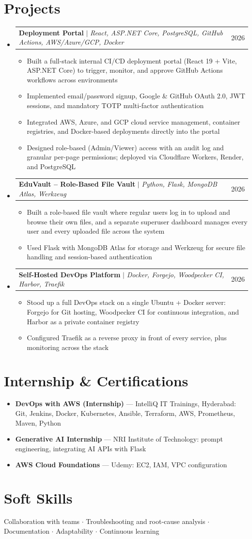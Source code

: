 \documentclass[letterpaper,11pt]{article}
\makeatletter
\newcommand{\resumeItem}[1]{
  \item\small{
    {#1 \vspace{-2pt}}
  }
}
\newcommand{\resumeProjectHeading}[2]{
    \item
    \begin{tabular*}{0.97\textwidth}{l@{\extracolsep{\fill}}r}
      \small#1 & #2 \\
    \end{tabular*}\vspace{-7pt}
}
\newcommand{\resumeSubHeadingListStart}{\begin{itemize}[leftmargin=0.15in, label={}]}
\newcommand{\resumeSubHeadingListEnd}{\end{itemize}}
\newcommand{\resumeItemListStart}{\begin{itemize}}
\newcommand{\resumeItemListEnd}{\end{itemize}\vspace{-5pt}}
\makeatother
\begin{document}
\section{Projects}
    \resumeSubHeadingListStart

      \resumeProjectHeading
          {\textbf{Deployment Portal} $|$ \emph{React, ASP.NET Core, PostgreSQL, GitHub Actions, AWS/Azure/GCP, Docker}}{2026}
          \resumeItemListStart
            \resumeItem{Built a full-stack internal CI/CD deployment portal (React 19 + Vite, ASP.NET Core) to trigger, monitor, and approve GitHub Actions workflows across environments}
            \resumeItem{Implemented email/password signup, Google \& GitHub OAuth 2.0, JWT sessions, and mandatory TOTP multi-factor authentication}
            \resumeItem{Integrated AWS, Azure, and GCP cloud service management, container registries, and Docker-based deployments directly into the portal}
            \resumeItem{Designed role-based (Admin/Viewer) access with an audit log and granular per-page permissions; deployed via Cloudflare Workers, Render, and PostgreSQL}
          \resumeItemListEnd

      \resumeProjectHeading
          {\textbf{EduVault -- Role-Based File Vault} $|$ \emph{Python, Flask, MongoDB Atlas, Werkzeug}}{2026}
          \resumeItemListStart
            \resumeItem{Built a role-based file vault where regular users log in to upload and browse their own files, and a separate superuser dashboard manages every user and every uploaded file across the system}
            \resumeItem{Used Flask with MongoDB Atlas for storage and Werkzeug for secure file handling and session-based authentication}
          \resumeItemListEnd

      \resumeProjectHeading
          {\textbf{Self-Hosted DevOps Platform} $|$ \emph{Docker, Forgejo, Woodpecker CI, Harbor, Traefik}}{2026}
          \resumeItemListStart
            \resumeItem{Stood up a full DevOps stack on a single Ubuntu + Docker server: Forgejo for Git hosting, Woodpecker CI for continuous integration, and Harbor as a private container registry}
            \resumeItem{Configured Traefik as a reverse proxy in front of every service, plus monitoring across the stack}
          \resumeItemListEnd

    \resumeSubHeadingListEnd

\section{Internship \& Certifications}
  \resumeSubHeadingListStart
    \resumeItem{\textbf{DevOps with AWS (Internship)} --- IntelliQ IT Trainings, Hyderabad: Git, Jenkins, Docker, Kubernetes, Ansible, Terraform, AWS, Prometheus, Maven, Python}
    \resumeItem{\textbf{Generative AI Internship} --- NRI Institute of Technology: prompt engineering, integrating AI APIs with Flask}
    \resumeItem{\textbf{AWS Cloud Foundations} --- Udemy: EC2, IAM, VPC configuration}
  \resumeSubHeadingListEnd

\section{Soft Skills}
\small{Collaboration with teams $\cdot$ Troubleshooting and root-cause analysis $\cdot$ Documentation $\cdot$ Adaptability $\cdot$ Continuous learning}
\end{document}
